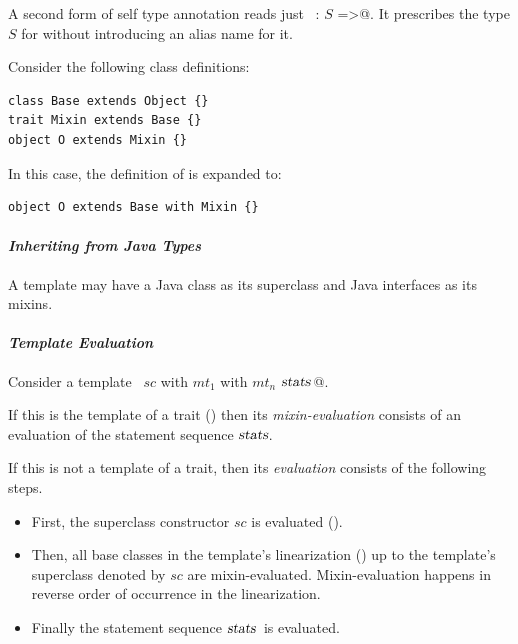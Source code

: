 A second form of self type annotation reads just 
~\lstinline@this: $S$ =>@. It prescribes the type $S$ for \lstinline@this@
without introducing an alias name for it. 

\example Consider the following class definitions:

\begin{lstlisting}
class Base extends Object {}
trait Mixin extends Base {}
object O extends Mixin {}
\end{lstlisting}
In this case, the definition of  is expanded to:
\begin{lstlisting}
object O extends Base with Mixin {}
\end{lstlisting}



\paragraph{\em Inheriting from Java Types} A template may have a Java class as
its superclass and Java interfaces as its mixins. 

\paragraph{\em Template Evaluation}
Consider a template ~\lstinline@$sc$ with $mt_1$ with $mt_n$ {$\mbox{\sl stats}\,$}@.

If this is the template of a trait () then its {\em
mixin-evaluation} consists of an evaluation of the statement sequence
$\mbox{\sl stats}$.

If this is not a template of a trait, then its {\em evaluation}
consists of the following steps.
\begin{itemize}
\item
First, the superclass constructor $sc$ is evaluated ().
\item
Then, all base classes in the template's linearization
() up to the
template's superclass denoted by $sc$ are
mixin-evaluated. Mixin-evaluation happens in reverse order of
occurrence in the linearization.
\item 
Finally the statement sequence $\mbox{\sl stats}\,$ is evaluated.
\end{itemize}

